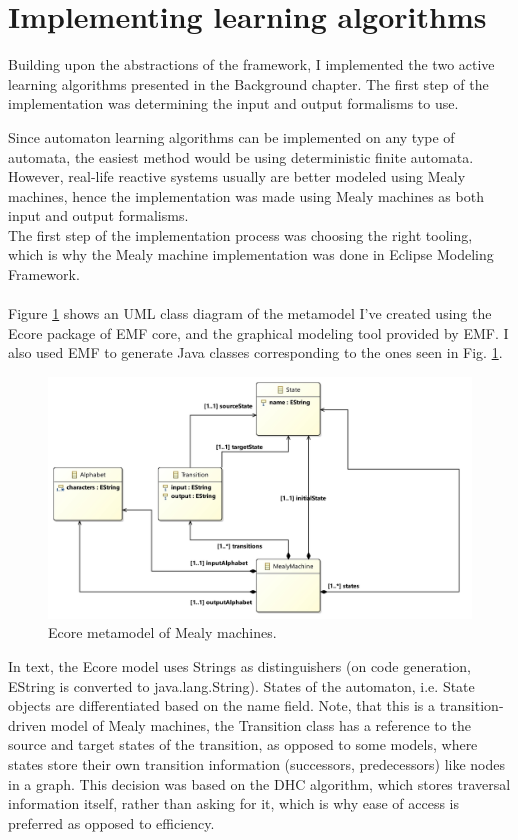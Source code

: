 \section{Implementing learning algorithms}

Building upon the abstractions of the framework, I implemented the two active learning algorithms presented in the Background chapter. The first step of the implementation was determining the input and output formalisms to use.

Since automaton learning algorithms can be implemented on any type of automata, the easiest method would be using deterministic finite automata. However, real-life reactive systems usually are better modeled using Mealy machines, hence the implementation was made using Mealy machines as both input and output formalisms.
\\
The first step of the implementation process was choosing the right tooling, which is why the Mealy machine implementation was done in Eclipse Modeling Framework.
\\\\
Figure \ref*{fig:mealyecore} shows an UML class diagram of the metamodel I've created using the Ecore package of EMF core, and the graphical modeling tool provided by EMF. I also used EMF to generate Java classes corresponding to the ones seen in Fig. \ref*{fig:mealyecore}.

\begin{figure}
	\centering
	\includegraphics[width=1.0\linewidth]{figures/mealymodel}
	\caption{Ecore metamodel of Mealy machines.}
	\label{fig:mealyecore}
\end{figure}

In text, the Ecore model uses Strings as distinguishers (on code generation, EString is converted to java.lang.String). States of the automaton, i.e. State objects are differentiated based on the name field. Note, that this is a transition-driven model of Mealy machines, the Transition class has a reference to the source and target states of the transition, as opposed to some models, where states store their own transition information (successors, predecessors) like nodes in a graph. This decision was based on the DHC algorithm, which stores traversal information itself, rather than asking for it, which is why ease of access is preferred as opposed to efficiency.

